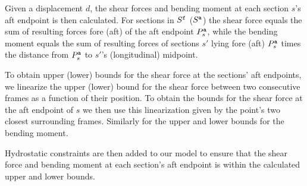 Given a displacement $d$, the shear forces and bending moment at each section $s$'s aft endpoint is then calculated. For sections in $S^{\texttt{f}}$ ($S^{\texttt{a}}$) the shear force  equals the sum of resulting forces fore (aft) of the aft endpoint $P^{\texttt{a}}_s$, while the bending moment equals the sum of resulting forces of sections $s'$ lying fore (aft) $P^{\texttt{a}}_s$ times the distance from $P^{\texttt{a}}_s$ to $s'$'s (longitudinal) midpoint.

To obtain upper (lower) bounds for the shear force at the sections' aft endpoints,  
we linearize the upper (lower) bound for the shear force between two consecutive frames as a function of their position. To obtain the bounds for the shear force at the aft endpoint of $s$ we then use this linearization given by the point's two closest surrounding frames. Similarly for the upper and lower bounds for the bending moment.

Hydrostatic constraints are then added to our model to ensure that the shear force and bending moment at each section's aft endpoint is within the calculated upper and lower bounds.


